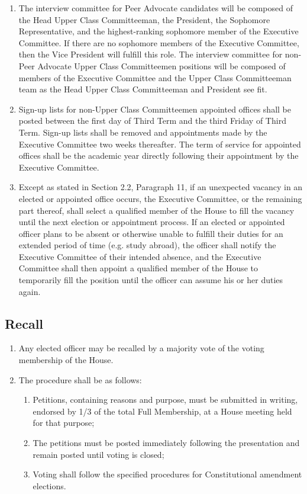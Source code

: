 \documentclass[10pt]{article} %
\begin{document}
\begin{enumerate}
\item The interview committee for Peer Advocate candidates will be composed of the Head Upper Class Committeeman, the President, the Sophomore Representative, and the highest-ranking sophomore member of the Executive Committee. If there are no sophomore members of the Executive Committee, then the Vice President will fulfill this role. The interview committee for non-Peer Advocate Upper Class Committeemen positions will be composed of members of the Executive Committee and the Upper Class Committeeman team as the Head Upper Class Committeeman and President see fit.
\item Sign-up lists for non-Upper Class Committeemen appointed offices shall be posted between the first day of Third Term and the third Friday of Third Term. Sign-up lists shall be removed and appointments made by the Executive Committee two weeks thereafter. The term of service for appointed offices shall be the academic year directly following their appointment by the Executive Committee. 
\item Except as stated in Section 2.2, Paragraph 11, if an unexpected vacancy in an elected or appointed office occurs, the Executive Committee, or the remaining part thereof, shall select a qualified member of the House to fill the vacancy until the next election or appointment process. If an elected or appointed officer plans to be absent or otherwise unable to fulfill their duties for an extended period of time (e.g. study abroad), the officer shall notify the Executive Committee of their intended absence, and the Executive Committee shall then appoint a qualified member of the House to temporarily fill the position until the officer can assume his or her duties again.
\end{enumerate}
\subsection{Recall}
\begin{enumerate}
\item Any elected officer may be recalled by a majority vote of the voting membership of the House. 
\item The procedure shall be as follows:
\begin{enumerate}
\item Petitions, containing reasons and purpose, must be submitted in writing, endorsed by 1/3 of the total Full Membership, at a House meeting held for that purpose;
\item The petitions must be posted immediately following the presentation and remain posted until voting is closed;
\item Voting shall follow the specified procedures for Constitutional amendment elections.
\end{enumerate}
\end{enumerate}
\end{document}
